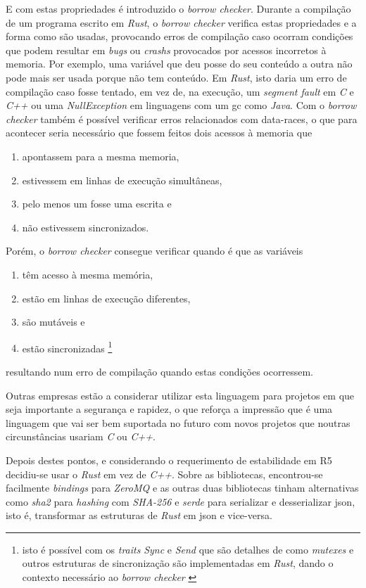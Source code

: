 E com estas propriedades é introduzido o  \textit{borrow checker}. Durante a compilação de um programa escrito em \textit{Rust}, o \textit{borrow checker} verifica estas propriedades e a forma como são usadas, provocando erros de compilação caso ocorram condições que podem resultar em \textit{bugs} ou \textit{crashs} provocados por acessos incorretos à memoria. Por exemplo, uma variável que deu posse do seu conteúdo a outra não pode mais ser usada porque não tem conteúdo. Em \textit{Rust}, isto daria um erro de compilação caso fosse tentado, em vez de, na execução, um \textit{segment fault} em \textit{C} e \textit{C++} ou uma \textit{NullException} em linguagens com um \gls{gc} como \textit{Java}.
Com o \textit{borrow checker} também é possível verificar erros relacionados com \glspl{data-race}, o que para acontecer seria necessário que fossem feitos dois acessos à memoria que
\begin{enumerate}
    \item apontassem para a mesma memoria,
    \item estivessem em linhas de execução simultâneas,
    \item pelo menos um fosse uma escrita e 
    \item não estivessem sincronizados.
\end{enumerate}
Porém, o \textit{borrow checker} consegue verificar quando é que as variáveis
\begin{enumerate}
    \item têm acesso à mesma memória,
    \item estão em linhas de execução diferentes,
    \item são mutáveis e
    \item estão sincronizadas
          \footnote{isto é possível com os \textit{traits} \textit{Sync} e \textit{Send} que são detalhes de como \textit{mutexes} e outros estruturas de sincronização são implementadas em \textit{Rust}, dando o contexto necessário ao \textit{borrow checker} \cite{sync_send_traits}}
\end{enumerate}
resultando num erro de compilação quando estas condições ocorressem.

Outras empresas estão a considerar utilizar esta linguagem para projetos em que seja importante a segurança e rapidez, o que reforça a impressão que é uma linguagem que vai ser bem suportada no futuro com novos projetos que noutras circunstâncias usariam \textit{C} ou \textit{C++}.

Depois destes pontos, e considerando o requerimento de estabilidade em R5 decidiu-se usar o \textit{Rust} em vez de \textit{C++}. Sobre as bibliotecas, encontrou-se facilmente \textit{bindings} para \textit{ZeroMQ} e as outras duas bibliotecas tinham alternativas como \textit{sha2} para \textit{hashing} com \textit{SHA-256} e \textit{serde} para serializar e desserializar \acrshort{json}, isto é, transformar as estruturas de \textit{Rust} em \acrshort{json} e vice-versa.


